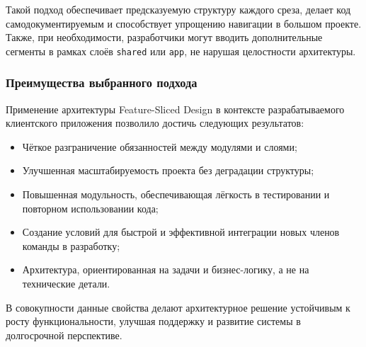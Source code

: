 Такой подход обеспечивает предсказуемую структуру каждого среза, делает код самодокументируемым и способствует упрощению навигации в большом проекте. Также, при необходимости, разработчики могут вводить дополнительные сегменты в рамках слоёв \texttt{shared} или \texttt{app}, не нарушая целостности архитектуры.

\subsubsection*{Преимущества выбранного подхода}

Применение архитектуры Feature-Sliced Design в контексте разрабатываемого клиентского приложения позволило достичь следующих результатов:

\begin{itemize}
  \item Чёткое разграничение обязанностей между модулями и слоями;
  \item Улучшенная масштабируемость проекта без деградации структуры;
  \item Повышенная модульность, обеспечивающая лёгкость в тестировании и повторном использовании кода;
  \item Создание условий для быстрой и эффективной интеграции новых членов команды в разработку;
  \item Архитектура, ориентированная на задачи и бизнес-логику, а не на технические детали.
\end{itemize}

В совокупности данные свойства делают архитектурное решение устойчивым к росту функциональности, улучшая поддержку и развитие системы в долгосрочной перспективе.
